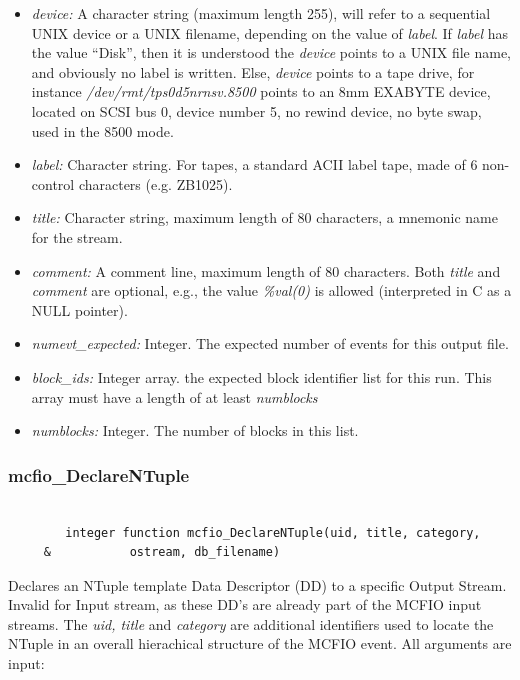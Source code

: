 \begin{itemize}
\item {\em device:} A  character
 string (maximum length 255), will refer to a  sequential UNIX device or a
 UNIX filename, depending on the value of {\em label}.  If {\em label} has
 the value ``Disk'', then it is understood the {\em device} points to
 a UNIX file name, and obviously no label is written. Else, {\em device} points
 to a tape drive, for instance {\em /dev/rmt/tps0d5nrnsv.8500} points to
 an 8mm EXABYTE device, located on SCSI bus 0, device number 5, no rewind
 device, no byte swap, used in the 8500 mode.
\item {\em label:} Character string. For tapes, a standard ACII label tape,
made of 6 non-control characters (e.g. ZB1025).
\item {\em title:} Character string, maximum length of 80 characters,
a mnemonic name for the stream.
\item {\em comment:} A comment line, maximum length of 80 characters. Both {\em title }
and {\em comment} are optional, e.g., the value {\em \%val(0)} is allowed
(interpreted in C as a NULL pointer).
\item {\em numevt\_expected:} Integer.  The expected number of events for this
output  file.
\item {\em block\_ids:} Integer array. the expected block identifier list for
this run. This array must have a length of at least {\em numblocks}
\item {\em numblocks:} Integer. The number of blocks in this list.
\end{itemize}



\subsubsection{mcfio\_DeclareNTuple}

\begin{verbatim}

        integer function mcfio_DeclareNTuple(uid, title, category,
     &           ostream, db_filename)

\end{verbatim}

Declares an NTuple template Data Descriptor (DD) to a specific Output Stream.
Invalid for Input stream, as these DD's are already part of the  MCFIO input
streams.  The {\em uid, title } and {\em category} are additional  identifiers
used to locate the NTuple in an overall hierachical structure  of the MCFIO
event.  All arguments are input:

